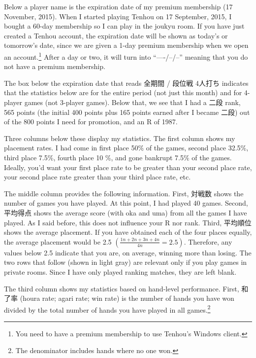 Below a player name is the expiration date of my premium membership (17 November, 2015). When I started playing {\jap Tenhou} on 17 September, 2015, I bought a 60-day membership so I can play in the {\jap joukyu} room. If you have just created a {\jap Tenhou} account, the expiration date will be shown as today's or tomorrow's date, since we are given a 1-day premium membership when we open an account.\footnote{You need to have a premium membership to use {\jap Tenhou}'s Windows client.} After a day or two, it will turn into ``----/--/--'' meaning that you do not have a premium membership.

\bigskip

The box below the expiration date that reads 全期間 / 段位戦 4人打ち indicates that the statistics below are for the entire period (not just this month) and for 4-player games (not 3-player games). Below that, we see that I had a 二段 rank, 565 points (the initial 400 points plus 165 points earned after I became 二段) out of the 800 points I need for promotion, and an R of 1987. 

\bigskip

Three columns below these display my statistics. The first column shows my placement rates. I had come in first place 50\% of the games, second place 32.5\%, third place 7.5\%, fourth place 10 \%, and gone bank\-rupt 7.5\% of the games. Ideally, you'd want your first place rate to be greater than your second place rate, your second place rate greater than your third place rate, etc. 

\bigskip

The middle column provides the following information. First, 対戦数 shows the number of games you have played. At this point, I had played 40 games. Second, 平均得点 shows the average score (with {\jap oka} and {\jap uma}) from all the games I have played. As I said before, this does not influence your R nor rank. Third, 平均順位 shows the average placement. If you have obtained each of the four places equally, the average placement would be 2.5 $\left( \frac{1  n + 2  n + 3  n + 4 n}{4n} = 2.5 \right)$. Therefore, any values below 2.5 indicate that you are, on average, winning more than losing. 
The two rows that follow (shown in light gray) are relevant only if you play games in private rooms. Since I have only played ranking matches, they are left blank. 

\bigskip

The third column shows my statistics based on hand-level performance. First, 和了率 ({\jap houra} rate; {\jap agari} rate; win rate) is the number of hands you have won divided by the total number of hands you have played in all games.\footnote{The denominator includes hands where no one won.} 

